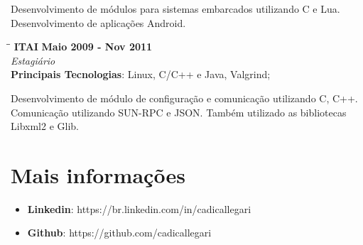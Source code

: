 \documentclass[margin]{res}
\begin{document}
\begin{resume}
       Desenvolvimento de módulos para sistemas embarcados utilizando C e Lua. Desenvolvimento de aplicações Android.

   \begin{tabbing}
   \hspace{2.3in}\= \hspace{1.5in}\= \kill %
    \textbf{ITAI}    \>\>\textbf{Maio 2009 - Nov 2011}\\
    \textit{Estagiário}\\
    \textbf{Principais Tecnologias}: Linux, C/C++ e Java, Valgrind;
   \end{tabbing}\vspace{-20pt}      %
    \vspace{2mm}
       Desenvolvimento de módulo de configuração e comunicação utilizando C, C++. Comunicação utilizando SUN-RPC e JSON. Também utilizado as bibliotecas Libxml2 e Glib.


\section{Mais informações}
    \begin{itemize}
        \item \textbf{Linkedin}: https://br.linkedin.com/in/cadicallegari
        \item \textbf{Github}: https://github.com/cadicallegari
    \end{itemize}


\end{resume}
\end{document}
